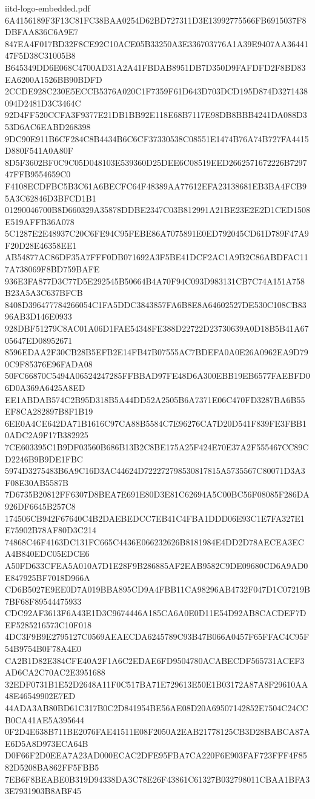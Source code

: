 \begin{filecontents*}[overwrite]{iitd-logo-embedded.pdf}
6A4156189F3F13C81FC38BAA0254D62BD727311D3E13992775566FB6915037F8DBFAA836C6A9E7
847EA4F017BD32F8CE92C10ACE05B33250A3E336703776A1A39E9407AA3644147F5D38C31005B8
B645349DD6E068C4700AD31A2A41FBDAB8951DB7D350D9FAFDFD2F8BD83EA6200A1526BB90BDFD
2CCDE928C230E5ECCB5376A020C1F7359F61D643D703DCD195D874D3271438094D2481D3C3464C
92D4FF520CCFA3F9377E21DB1BB92E118E68B7117E98DB8BBB4241DA088D353D6AC6EABD268398
9DC90E911B6CF284C8B4434B6C6CF37330538C08551E1474B76A74B727FA4415D880F541A0A80F
8D5F3602BF0C9C05D048103E539360D25DEE6C08519EED2662571672226B729747FFB9554659C0
F4108ECDFBC5B3C61A6BECFC64F48389AA77612EFA23138681EB3BA4FCB95A3C62846D3BFCD1B1
01290046700B8D660329A35878DDBE2347C03B812991A21BE23E2E2D1CED1508E519AFFB36A078
5C1287E2E48937C20C6FE94C95FEBE86A7075891E0ED792045CD61D789F47A9F20D28E46358EE1
AB54877AC86DF35A7FFF0DB071692A3F5BE41DCF2AC1A9B2C86ABDFAC117A738069F8BD759BAFE
936E3FA877D3C77D5E292545B50664B4A70F94C093D983131CB7C74A151A758B23A5A3C637BFCB
8408D396477784266054C1FA5DDC3843857FA6B8E8A64602527DE530C108CB8396AB3D146E0933
928DBF51279C8AC01A06D1FAE54348FE388D22722D23730639A0D18B5B41A6705647ED08952671
8596EDAA2F30CB28B5EFB2E14FB47B07555AC7BDEFA0A0E26A0962EA9D790C9F85376E96FADA08
50FC66870C5494A06524247285FFBBAD97FE48D6A300EBB19EB6577FAEBFD06D0A369A6425A8ED
EE1ABDAB574C2B95D318B5A44DD52A2505B6A7371E06C470FD3287BA6B55EF8CA282897B8F1B19
6EE0A4CE642DA71B1616C97CA88B5584C7E96276CA7D20D541F839FE3FBB10ADC2A9F17B382925
7CE603395C1B9DF03560B686B13B2C8BE175A25F424E70E37A2F555467CC89CD2246B9B9DE1FBC
5974D3275483B6A9C16D3AC44624D722272798530817815A5735567C80071D3A3F08E30AB5587B
7D6735B20812FF6307D8BEA7E691E80D3E81C62694A5C00BC56F08085F286DA926DF6645B257C8
174506CB942F67640C4B2DAEBEDCC7EB41C4FBA1DDD06E93C1E7FA327E1E75902B78AF80D3C214
74868C46F4163DC131FC665C4436E066232626B8181984E4DD2D78AECEA3ECA4B840EDC05EDCE6
A50FD633CFEA5A010A7D1E28F9B286885AF2EAB9582C9DE09680CD6A9AD0E847925BF7018D966A
CD6B5027E9EE0D7A019BBA895CD9A4FBB11CA98296AB4732F047D1C07219B7BF68F89544475933
CDC92AF3613F6A43E1D3C9674446A185CA6A0E0D11E54D92AB8CACDEF7DEF5285216573C10F018
4DC3F9B9E2795127C0569AEAECDA6245789C93B47B066A0457F65FFAC4C95F54B9754B0F78A4E0
CA2B1D82E384CFE40A2F1A6C2EDAE6FD9504780ACABECDF565731ACEF3AD6CA2C70AC2E3951688
32EDF0731B1E52D2648A11F0C517BA71E729613E50E1B03172A87A8F29610AA48E46549902E7ED
44ADA3AB80BD61C317B0C2D841954BE56AE08D20A69507142852E7504C24CCB0CA41AE5A395644
0F2D4E638B711BE2076FAE41511E08F2050A2EAB21778125CB3D28BABCA87AE6D5A8D973ECA64B
D0F66F2D0EEA7A23AD000ECAC2DFE95FBA7CA220F6E903FAF723FFF4F8582D5208BA862FF5FBB5
7EB6F8BEABE0B319D94338DA3C78E26F43861C61327B032798011CBAA1BFA33E7931903B8ABF45

\end{filecontents*}
